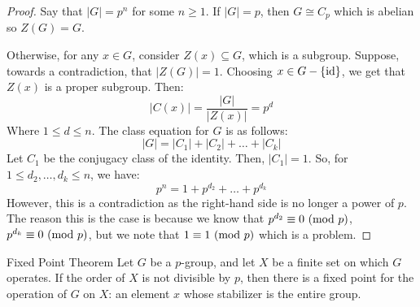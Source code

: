 \documentclass[letterpaper]{article}
\begin{document}
\begin{mdframed}
    \begin{proof}
        Say that $|G| = p^n$ for some $n \geq 1$. If $|G| = p$, then $G \cong C_p$ which is abelian so $Z(G) = G$. 
        
        \bigskip 

        Otherwise, for any $x \in G$, consider $Z(x) \subseteq G$, which is a subgroup. Suppose, towards a contradiction, that $|Z(G)| = 1$. Choosing $x \in G - \{\operatorname{id}\}$, we get that $Z(x)$ is a proper subgroup. Then: 
        \[|C(x)| = \frac{|G|}{|Z(x)|} = p^d\]
        Where $1 \leq d \leq n$. The class equation for $G$ is as follows: 
        \[|G| = |C_1| + |C_2| + \dots + |C_k|\]
        Let $C_1$ be the conjugacy class of the identity. Then, $|C_1| = 1$. So, for $1 \leq d_2, \dots, d_k \leq n$, we have: 
        \[p^n = 1 + p^{d_2} + \dots + p^{d_k}\]
        However, this is a contradiction as the right-hand side is no longer a power of $p$. The reason this is the case is because we know that $p^{d_2} \equiv 0 \ (\mathrm{mod}\ p)$, $p^{d_k} \equiv 0 \ (\mathrm{mod}\ p)$, but we note that $1 \equiv 1 \ (\mathrm{mod}\ p)$ which is a problem. 
    \end{proof}
\end{mdframed}

\begin{theorem}{Fixed Point Theorem}{}
    Let $G$ be a $p$-group, and let $X$ be a finite set on which $G$ operates. If the order of $X$ is not divisible by $p$, then there is a fixed point for the operation of $G$ on $X$: an element $x$ whose stabilizer is the entire group. 
\end{theorem}
\end{document}
